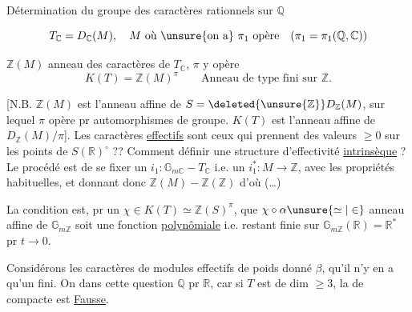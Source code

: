 Détermination du groupe des caractères rationnels sur $\mathbb Q$

\[
T_{\mathbb C}=D_{\mathbb C}(M),\quad M\text{ où \unsure{on a} }\pi_1\text{ opère}\quad(\pi_1=\pi_1(\mathbb Q,\mathbb C))
\]

$\mathbb Z(M)$ anneau des caractères  de $T_{\mathbb C}$, $\pi$ y opère
\[
K(T)=\mathbb Z(M)^\pi\qquad\text{Anneau de type fini sur }\mathbb Z.
\]

[N.B. $\mathbb Z(M)$ est l'anneau affine de $S=\deleted{\unsure{\mathbb Z}}D_{\mathbb Z}(M)$, sur lequel $\pi$ opère pr automorphismes de groupe. $K(T)$ est l'anneau affine de $D_{\mathbb Z}(M)/\pi$]. Les caractères \uline{effectifs} sont ceux qui prennent des valeurs $\geq0$ sur les points de $S(\mathbb R)^\circ$ ?? Comment définir une structure d'effectivité \uline{intrinsèque} ? Le procédé  est de se fixer un $i_1:\mathbb G_{m\mathbb C}\mathbin{-}T_{\mathbb C}$ i.e. un $i_1^*:M\longrightarrow\mathbb Z$, avec les propriétés habituelles, et donnant donc $\mathbb Z(M)\mathbin{-}\mathbb Z(\mathbb Z)$ d'où
(\ldots)


La condition est,  pr un $\chi\in K(T)\simeq\mathbb Z(S)^\pi$, que $\chi\circ\alpha\unsure{\simeq|\in}$  anneau affine de $\mathbb G_{m\mathbb Z}$ soit une fonction \uline{polynômiale} i.e. restant finie sur $\mathbb G_{m\mathbb Z}(\mathbb R)=\mathbb R^*$ pr $t\to0$.

Considérons les caractères de modules effectifs de poids donné $\beta$,  qu'il n'y en a qu'un  fini. On     dans cette question $\mathbb Q$ pr $\mathbb R$,  car si $T$ est de dim $\geq3$, la  de  compacte est \uline{Fausse}.

